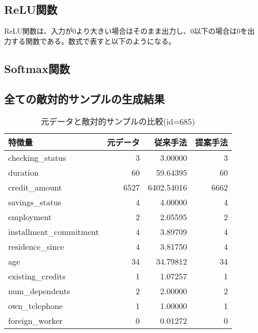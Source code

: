 \subsection*{ReLU関数}
ReLU関数は、入力が0より大きい場合はそのまま出力し、0以下の場合は0を出力する関数である。数式で表すと以下のようになる。

\subsection*{Softmax関数}

\subsection*{全ての敵対的サンプルの生成結果}
\begin{table}[H]
    \centering
    \caption{元データと敵対的サンプルの比較(id=685)}
    \begin{tabular}{|l|r|r|r|} \hline
        特徴量 & 元データ & 従来手法 & 提案手法 \\ \hline
        checking\_status & 3 & 3.00000 & 3 \\ \hline
        duration & 60 & 59.64395 & 60 \\ \hline
        credit\_amount & 6527 & 6402.54016 & 6662 \\ \hline
        savings\_status & 4 & 4.00000 & 4 \\ \hline
        employment & 2 & 2.05595 & 2 \\ \hline
        installment\_commitment & 4 & 3.89709 & 4 \\ \hline
        residence\_since & 4 & 3.81750 & 4 \\ \hline
        age & 34 & 34.79812 & 34 \\ \hline
        existing\_credits & 1 & 1.07257 & 1 \\ \hline
        num\_dependents & 2 & 2.00000 & 2 \\ \hline
        own\_telephone & 1 & 1.00000 & 1 \\ \hline
        foreign\_worker & 0 & 0.01272 & 0 \\ \hline
    \end{tabular}
\end{table}

